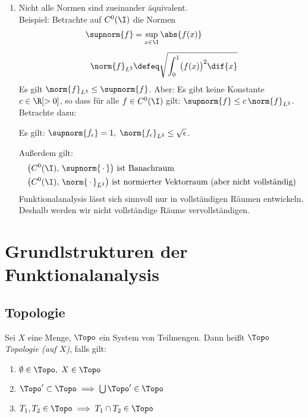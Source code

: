 \begin{thEmpty}
\begin{enumerate}[(1)]
    \item
        Nicht alle Normen sind zueinander äquivalent.\\
        Beispiel: Betrachte auf $C^0(\I)$ die Normen
        \begin{align*}
            \supnorm{f} &= \sup_{x\in\I} \abs{f(x)}  
            \\[1ex]
            \norm{f}_{L^2} &\defeq \sqrt{ \int_0^1 \bigl(f(x)\bigr)^2 \dif{x} }
        \end{align*}
        Es gilt $\norm{f}_{L^2} \leq \supnorm{f}$. Aber: Es gibt keine Konstante
        $c\in\R[>0]$, so dass für alle $f\in C^0(\I)$ gilt: $\supnorm{f}\leq
        c\,\norm{f}_{L^2}$. Betrachte dazu:
        \begin{center}
            \pgfmathsetmacro{}
        \end{center}
        Es gilt: $\supnorm{f_\epsilon} = 1,\; \norm{f_\epsilon}_{L^2} \leq
        \sqrt{\epsilon}$.

        Außerdem gilt:
        \begin{align*}
            & \bigl( C^0(\I),\,\supnorm{\,\cdot\,} \bigr)
            \text{ ist Banachraum}
            \\
            & \bigl( C^0(\I),\,\norm{\,\cdot\,}_{L^2} \bigr)
            \text{ ist normierter Vektorraum (aber nicht vollständig)}
        \end{align*}
        Funktionalanalysis lässt sich sinnvoll nur in vollständigen Räumen
        entwickeln. Deshalb werden wir nicht vollständige Räume
        vervollständigen.
    \end{enumerate}
\end{thEmpty}


\chapter{Grundlstrukturen der Funktionalanalysis}
\section{Topologie}
Sei $X$ eine Menge, $\Topo$ ein System von Teilmengen. Dann heißt $\Topo$
\emph{Topologie (auf $X$)}, falls gilt:
\begin{enumerate}[({T}1),leftmargin=2cm]
    \item
        \quad $\emptyset\in\Topo,\;X\in\Topo$
    \item
        \quad $\Topo'\subset\Topo \implies \bigcup \Topo' \in \Topo$
    \item
        \quad $T_1,T_2\in\Topo \implies T_1\cap T_2\in\Topo$
\end{enumerate}

